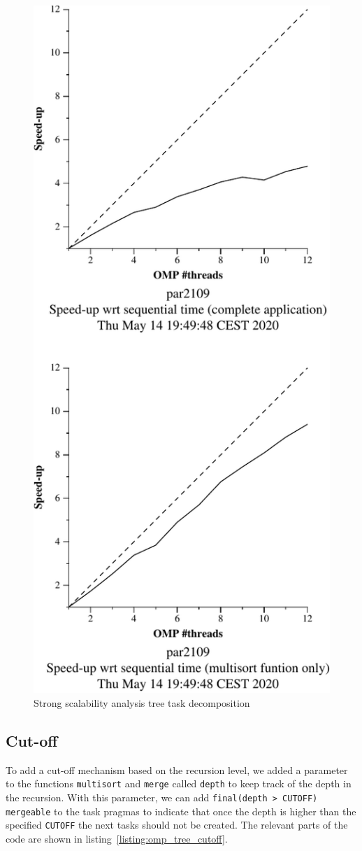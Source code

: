 \begin{figure}[H]
\begin{minipage}{0.5\textwidth}
        \includegraphics[width=0.7\linewidth]{plots/new-omp-tree-crop.pdf}
        \caption{Strong scalability analysis tree task decomposition}
        \label{fig:ssa_tree} 
    \end{minipage}
\end{figure}

\subsection{Cut-off}

To add a cut-off mechanism based on the recursion level, we added a parameter to the functions
\texttt{multisort} and \texttt{merge} called \texttt{depth} to keep track of the depth in the recursion.
With this parameter, we can add \texttt{final(depth > CUTOFF) mergeable} to the task pragmas to indicate
that once the depth is higher than the specified \texttt{CUTOFF} the next tasks should not be created.
The relevant parts of the code are shown in listing~\ref{listing:omp_tree_cutoff}.

